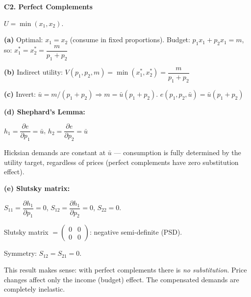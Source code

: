 \documentclass[12pt, a4paper]{article}
\theoremstyle{definition}
\newcommand{\pp}[2]{\dfrac{\partial #1}{\partial #2}}
\begin{document}
\begin{solbox}
\textbf{C2. Perfect Complements}

$U=\min(x_1,x_2)$.

\textbf{(a)} Optimal: $x_1=x_2$ (consume in fixed proportions). Budget: $p_1x_1+p_2x_1=m$, so:
$x_1^* = x_2^* = \dfrac{m}{p_1+p_2}$

\textbf{(b)} Indirect utility: $V(p_1,p_2,m) = \min(x_1^*,x_2^*) = \dfrac{m}{p_1+p_2}$

\textbf{(c)} Invert: $\bar u = m/(p_1+p_2) \Rightarrow m = \bar u(p_1+p_2)$.
$e(p_1,p_2,\bar u) = \bar u(p_1+p_2)$

\textbf{(d) Shephard's Lemma:}

$h_1 = \pp{e}{p_1} = \bar u$, \quad $h_2 = \pp{e}{p_2} = \bar u$

Hicksian demands are constant at $\bar u$ --- consumption is fully determined by the utility target, regardless of prices (perfect complements have zero substitution effect).

\textbf{(e) Slutsky matrix:}

$S_{11} = \pp{h_1}{p_1} = 0$, $S_{12} = \pp{h_1}{p_2} = 0$, $S_{22} = 0$.

Slutsky matrix $= \begin{pmatrix}0&0\\0&0\end{pmatrix}$: negative semi-definite (PSD). \checkmark

Symmetry: $S_{12}=S_{21}=0$. \checkmark

This result makes sense: with perfect complements there is \emph{no substitution}. Price changes affect only the income (budget) effect. The compensated demands are completely inelastic.
\end{solbox}
\end{document}
